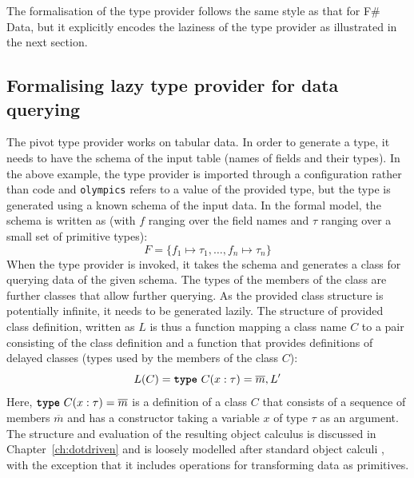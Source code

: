 \documentclass[fleqn,11pt]{report}
\newcommand{\kvd}[1]{\textnormal{\ttfamily\bfseries #1}}
\theoremstyle{definition}
\begin{document}
The formalisation of the type provider follows the same style as that for F\# Data, but it explicitly
encodes the laziness of the type provider as illustrated in the next section.

\subsection{Formalising lazy type provider for data querying}
The pivot type provider works on tabular data. In order to generate a type, it needs to have the
schema of the input table (names of fields and their types). In the above example, the type
provider is imported through a configuration rather than code and \texttt{olympics} refers to a
value of the provided type, but the type is generated using a known schema of the input data.
In the formal model, the schema is written as (with $f$ ranging over the field names and
$\tau$ ranging over a small set of primitive types):
%
\begin{equation*}
F=\{ f_1 \mapsto \tau_1, \ldots, f_n \mapsto \tau_n \}
\end{equation*}
%
When the type provider is invoked, it takes the schema and generates a class for querying data
of the given schema. The types of the members of the class are further classes that allow further
querying. As the provided class structure is potentially infinite, it needs to be generated
lazily. The structure of provided class definition, written as $L$ is thus a function mapping
a class name $C$ to a pair consisting of the class definition and a function that provides
definitions of delayed classes (types used by the members of the class $C$):
%
\begin{equation*}
L(C) = \kvd{type}~C(x:\tau) = \overline{m}, L'
\end{equation*}
%
Here, $\kvd{type}~C(x:\tau) = \overline{m}$ is a definition of a class $C$ that consists of a
sequence of members $\overline{m}$ and has a constructor taking a variable $x$ of type $\tau$ as
an argument. The structure and evaluation of the resulting object calculus is discussed
in Chapter~\ref{ch:dotdriven} and is loosely modelled after standard object calculi
\citep{igarashi-2001-fj,abadi-2012-objects}, with the exception that it includes
operations for transforming data as primitives.
\end{document}
